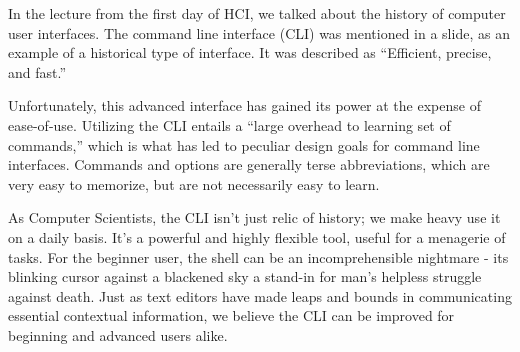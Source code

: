 In the lecture from the first day of HCI, we talked about the history of
computer user interfaces. The command line interface (CLI) was mentioned in a
slide, as an example of a historical type of interface. It was described as
“Efficient, precise, and fast.”

Unfortunately, this advanced interface has gained its power at the expense of
ease-of-use. Utilizing the CLI entails a “large overhead to learning set of
commands,” which is what has led to peculiar design goals for command line
interfaces. Commands and options are generally terse abbreviations, which are
very easy to memorize, but are not necessarily easy to learn.

As Computer Scientists, the CLI isn’t just relic of history; we make heavy use
it on a daily basis. It’s a powerful and highly flexible tool, useful for a
menagerie of tasks. For the beginner user, the shell can be an incomprehensible
nightmare - its blinking cursor against a blackened sky a stand-in for man’s
helpless struggle against death. Just as text editors have made leaps and bounds
in communicating essential contextual information, we believe the CLI can be
improved for beginning and advanced users alike.
